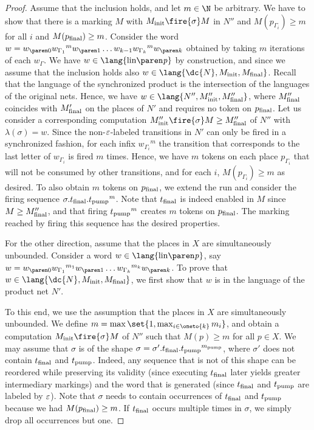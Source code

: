 \documentclass[../../diss.tex]{subfiles}
\begin{document}
\begin{proof}
    Assume that the inclusion holds, and let $m \in \N$ be arbitrary.
    We have to show that there is a marking $M$ with $\Minit \fire{\sigma} M$ in $N''$ and $M(p_{\Gamma_i}) \geq m$ for all $i$ and $M(p_{\text{final}}) \geq m$.
    Consider the word $w = \dtr{w}{0} {w_{\Gamma_1}}^m \dtr{w}{1} \ldots w_{k-1} {w_{\Gamma_k}}^m \dtr{w}{k}$ obtained by taking $m$ iterations of each $w_\Gamma$.
    We have $w \in \lang{\linof{\product}}$ by construction, and since we assume that the inclusion holds also $w \in \lang{\dc{N}, \Minit, \Mfinal}$.
    Recall that the language of the synchronized product is the intersection of the languages of the original nets.
    Hence, we have $w \in \lang{N'',\Minit'',\Mfinal''}$, where $M_{\text{final}}''$ coincides with $M_{\text{final}}'$ on the places of $N'$ and requires no token on $p_{\text{final}}$.
    Let us consider a corresponding computation $\Minit'' \fire{\sigma} M \geq \Mfinal''$ of $N''$ with $\lambda(\sigma) = w$.
    Since the non-$\varepsilon$-labeled transitions in $N'$ can only be fired in a synchronized fashion, for each infix ${w_{\Gamma_i}}^m$ the transition that corresponds to the last letter of $w_{\Gamma_i}$ is fired $m$ times.
    Hence, we have $m$ tokens on each place $p_{\Gamma_i}$ that will not be consumed by other transitions, and for each $i$, $M(p_{\Gamma_i}) \geq m$ as desired.
    To also obtain $m$ tokens on $p_{\text{final}}$, we extend the run and consider the firing sequence $\sigma.t_{\text{final}}.{t_{\text{pump}}}^m$.
    Note that $t_{\text{final}}$ is indeed enabled in $M$ since $M \geq M_{\text{final}}''$, and that firing ${t_{\text{pump}}}^m$ creates $m$ tokens on $p_{\text{final}}$.
    The marking reached by firing this sequence has the desired properties.

    For the other direction, assume that the places in $X$ are simultaneously unbounded.
    Consider a word $w \in \lang{\linof{\product}}$, say $w = \dtr{w}{0} {w_{\Gamma_1}}^{m_1} \dtr{w}{1} \ldots {w_{\Gamma_k}}^{m_k} \dtr{w}{k}$.
    To prove that $w \in \lang{\mathmbox{\dc{N}}, \Minit, \Mfinal}$, we first show that $w$ is in the language of the product net $N'$.

    To this end, we use the assumption that the places in $X$ are simultaneously unbounded.
    We define $m = \max \set{1,\max_{i \in \oneto{k}} m_i}$, and obtain a computation $\Minit \fire{\sigma} M$ of $N''$ such that $M(p) \geq m$ for all $p \in X$.
    We may assume \wolog that $\sigma$ is of the shape $\sigma = \sigma'.t_{\text{final}}.{t_{\text{pump}}}^{m_{\text{pump}}}$, where $\sigma'$ does not contain $t_{\text{final}}$ and $t_{\text{pump}}$.
    Indeed, any sequence that is not of this shape can be reordered while preserving its validity (since executing $t_{\text{final}}$ later yields greater intermediary markings) and the word that is generated (since $t_{\text{final}}$ and $t_{\text{pump}}$ are labeled by $\varepsilon$).
    Note that $\sigma$ needs to contain occurrences of $t_{\text{final}}$ and $t_{\text{pump}}$ because we had $M(p_{\text{final}}) \geq m$.
    If $t_{\text{final}}$ occurs multiple times in $\sigma$, we simply drop all occurrences but one.


\end{proof}
\end{document}
